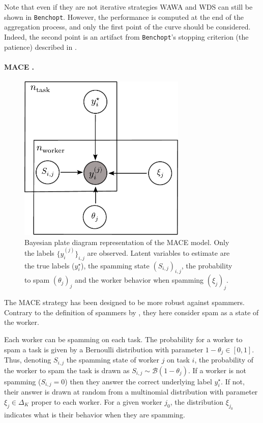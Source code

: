 Note that even if they are not iterative strategies WAWA and WDS can still be shown in \texttt{Benchopt}.
However, the performance is computed at the end of the aggregation process, and only the first point of the curve should be considered. Indeed, the second point is an artifact from \texttt{Benchopt}'s stopping criterion (the patience) described in .

\paragraph{MACE \citep{hovy2013learning}.}

\begin{figure}[tbh]
    \centering
    \includegraphics[height=8cm, keepaspectratio]{./images_benchopt/mace_plate.pdf}
    \caption{Bayesian plate diagram representation of the MACE model. Only the labels $\{y_i^{(j)}\}_{i,j}$ are observed. Latent variables to estimate are the true labels ($y_i^\star$), the spamming state $(S_{i,j})_{i,j}$, the probability to spam $(\theta_j)_j$ and the worker behavior when spamming $(\xi_j)_j$.}
    \label{fig:plate_mace}
\end{figure}

The MACE strategy has been designed to be more robust against spammers.
Contrary to the definition of spammers by \citet{raykar_ranking_2011}, they here consider spam as a state of the worker.

Each worker can be spamming on each task. The probability for a worker to spam a task is given by a Bernoulli distribution with parameter $1-\theta_j\in[0, 1]$. Thus, denoting $S_{i,j}$ the spamming state of worker $j$ on task $i$, the probability of the worker to spam the task is drawn as $S_{i,j}\sim\mathcal{B}(1-\theta_j)$. If a worker is not spamming ($S_{i,j}=0$) then they answer the correct underlying label $y_i^\star$. If not, their answer is drawn at random from a multinomial distribution with parameter $\xi_j\in\Delta_{K}$ proper to each worker.
For a given worker $j_0$, the distribution $\xi_{j_0}$ indicates what is their behavior when they are spamming.

